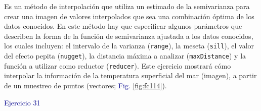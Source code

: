 \documentclass[
  12pt,
  letterpaper,
  twoside]{book}
\begin{document}
 Es un método de interpolación que utiliza un estimado de
la semivarianza para crear una imagen de valores interpolados que sea
una combinación óptima de los datos conocidos. En este método hay que
especificar algunos parámetros que describen la forma de la función de
semivarianza ajustada a los datos conocidos, los cuales incluyen: el
intervalo de la varianza (\texttt{range}), la meseta (\texttt{sill}), el valor del
efecto pepita (\texttt{nugget}), la distancia máxima a analizar (\texttt{maxDistance})
y la función a utilizar como reductor (\texttt{reducer}). Este ejercicio
mostrará cómo interpolar la información de la temperatura superficial
del mar (imagen), a partir de un muestreo de puntos (vectores;
\textcolor{darkblue}{Fig.} \ref{fig:fc114}).

\textcolor{darkblue}{Ejercicio 31}
\end{document}
